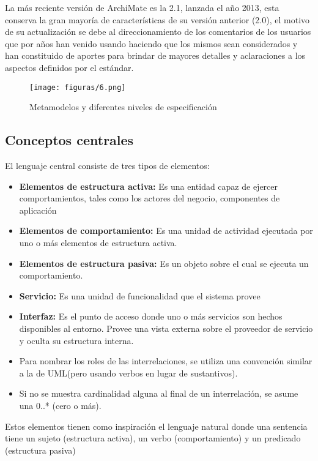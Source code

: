   La más reciente versión de ArchiMate es la 2.1, lanzada el año 2013, esta conserva la gran mayoría de características de su versión anterior (2.0), el motivo de su actualización se debe al direccionamiento de los comentarios de los usuarios que por años han venido usando haciendo que los mismos sean considerados y han constituido de aportes para brindar de mayores detalles y aclaraciones a los aspectos definidos por el estándar.
  
 \begin{figure}[!h]
   	\centering
   	\texttt{[image: figuras/6.png]}
   	\captionsetup{width=.95\textwidth}
   	\caption{Metamodelos y diferentes niveles de especificación}
   	\label{figura6}
 \end{figure}
  
  \subsection{Conceptos centrales}
  El lenguaje central consiste de tres tipos de elementos:
    \begin{itemize}
	  \item \textbf{Elementos de estructura activa:} Es una entidad capaz de ejercer comportamientos, tales como los actores del negocio, componentes de aplicación
	  \item \textbf{Elementos de comportamiento:} Es una unidad de actividad ejecutada por uno o más elementos de estructura activa.
	  \item \textbf{Elementos de estructura pasiva:} Es un objeto sobre el cual se ejecuta un comportamiento.
	  \item \textbf{Servicio:} Es una unidad de funcionalidad que el sistema provee
	  \item \textbf{Interfaz:} Es el punto de acceso donde uno o más servicios son hechos disponibles al entorno. Provee una vista externa sobre el proveedor de servicio y oculta su estructura interna.
	  \item Para nombrar los roles de las interrelaciones, se utiliza una convención similar a la de UML(pero usando verbos en lugar de sustantivos).
	  \item Si no se muestra cardinalidad alguna al final de un interrelación, se asume una 0..* (cero o más).
    \end{itemize}
  Estos elementos tienen como inspiración el lenguaje natural donde una sentencia tiene un sujeto (estructura activa), un verbo (comportamiento) y un predicado (estructura pasiva)
  
